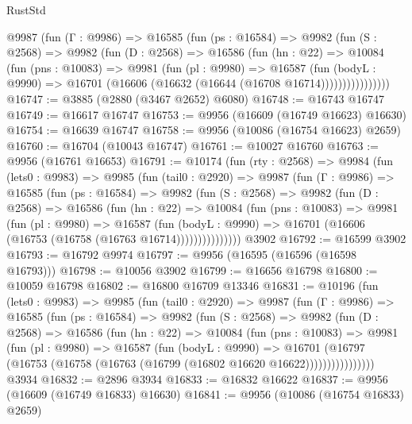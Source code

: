 \begin{lexlean}{RustStd}
\begin{coremodule}
          @9987
            (fun (Γ : @9986) =>
            @16585
              (fun (ps : @16584) =>
              @9982
                (fun (S : @2568) =>
                @9982
                  (fun (D : @2568) =>
                  @16586
                    (fun (hn : @22) =>
                    @10084
                      (fun (pns : @10083) =>
                      @9981
                        (fun (pl : @9980) =>
                        @16587
                          (fun (bodyL : @9990) =>
                          @16701 (@16606 (@16632 (@16644 (@16708 @16714))))))))))))))))
@16747 := @3885 (@2880 (@3467 @2652) @6080)
@16748 := @16743 @16747
@16749 := @16617 @16747
@16753 := @9956 (@16609 (@16749 @16623) @16630)
@16754 := @16639 @16747
@16758 := @9956 (@10086 (@16754 @16623) @2659)
@16760 := @16704 (@10043 @16747)
@16761 := @10027 @16760
@16763 := @9956 (@16761 @16653)
@16791 := @10174
    (fun (rty : @2568) =>
    @9984
      (fun (lets0 : @9983) =>
      @9985
        (fun (tail0 : @2920) =>
        @9987
          (fun (Γ : @9986) =>
          @16585
            (fun (ps : @16584) =>
            @9982
              (fun (S : @2568) =>
              @9982
                (fun (D : @2568) =>
                @16586
                  (fun (hn : @22) =>
                  @10084
                    (fun (pns : @10083) =>
                    @9981
                      (fun (pl : @9980) =>
                      @16587
                        (fun (bodyL : @9990) =>
                        @16701 (@16606 (@16753 (@16758 (@16763 @16714)))))))))))))))
    @3902
@16792 := @16599 @3902
@16793 := @16792 @9974
@16797 := @9956 (@16595 (@16596 (@16598 @16793)))
@16798 := @10056 @3902
@16799 := @16656 @16798
@16800 := @10059 @16798
@16802 := @16800 @16709 @13346
@16831 := @10196
    (fun (lets0 : @9983) =>
    @9985
      (fun (tail0 : @2920) =>
      @9987
        (fun (Γ : @9986) =>
        @16585
          (fun (ps : @16584) =>
          @9982
            (fun (S : @2568) =>
            @9982
              (fun (D : @2568) =>
              @16586
                (fun (hn : @22) =>
                @10084
                  (fun (pns : @10083) =>
                  @9981
                    (fun (pl : @9980) =>
                    @16587
                      (fun (bodyL : @9990) =>
                      @16701
                        (@16797
                          (@16753 (@16758 (@16763 (@16799 (@16802 @16620 @16622))))))))))))))))
    @3934
@16832 := @2896 @3934
@16833 := @16832 @16622
@16837 := @9956 (@16609 (@16749 @16833) @16630)
@16841 := @9956 (@10086 (@16754 @16833) @2659)

\end{coremodule}
\end{lexlean}
